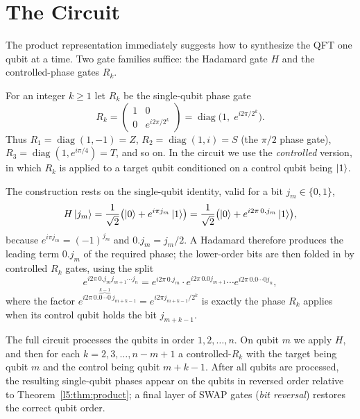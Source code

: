 \section{The Circuit}

The product representation immediately suggests how to synthesize the QFT one
qubit at a time. Two gate families suffice: the Hadamard gate $H$ and the
controlled-phase gates $R_k$.

\begin{definition}\label{l5:def:Rk}
For an integer $k\ge 1$ let $R_k$ be the single-qubit phase gate
\[
  R_k = \begin{pmatrix} 1 & 0 \\ 0 & e^{i 2\pi/2^{k}} \end{pmatrix}
      = \operatorname{diag}\!\bigl(1,\; e^{i 2\pi/2^{k}}\bigr).
\]
Thus $R_1 = \operatorname{diag}(1,-1) = Z$, $R_2 = \operatorname{diag}(1,i) = S$
(the $\pi/2$ phase gate), $R_3 = \operatorname{diag}(1, e^{i\pi/4}) = T$, and so
on. In the circuit we use the \emph{controlled} version, in which $R_k$ is
applied to a target qubit conditioned on a control qubit being $\ket{1}$.
\end{definition}

The construction rests on the single-qubit identity, valid for a bit
$j_m\in\{0,1\}$,
\[
  H\ket{j_m}
   = \frac{1}{\sqrt2}\bigl(\ket{0} + e^{i\pi j_m}\ket{1}\bigr)
   = \frac{1}{\sqrt2}\bigl(\ket{0} + e^{i 2\pi\, 0.j_m}\ket{1}\bigr),
\]
because $e^{i\pi j_m} = (-1)^{j_m}$ and $0.j_m = j_m/2$. A Hadamard therefore
produces the leading term $0.j_m$ of the required phase; the lower-order bits
are then folded in by controlled $R_k$ gates, using the split
\[
  e^{i2\pi\,0.j_m j_{m+1}\cdots j_n}
   = e^{i2\pi\,0.j_m}\cdot e^{i2\pi\,0.0 j_{m+1}}\cdots e^{i2\pi\,0.0\cdots 0 j_n},
\]
where the factor $e^{i2\pi\,0.\overbrace{0\cdots0}^{k-1}\,j_{m+k-1}}
= e^{i2\pi j_{m+k-1}/2^{k}}$ is exactly the phase $R_k$ applies when its control
qubit holds the bit $j_{m+k-1}$.

The full circuit processes the qubits in order $1,2,\dots,n$. On qubit $m$ we
apply $H$, and then for each $k = 2,3,\dots, n-m+1$ a controlled-$R_k$ with the
target being qubit $m$ and the control being qubit $m+k-1$. After all qubits are
processed, the resulting single-qubit phases appear on the qubits in reversed
order relative to Theorem~\ref{l5:thm:product}; a final layer of SWAP gates
(\emph{bit reversal}) restores the correct qubit order.

